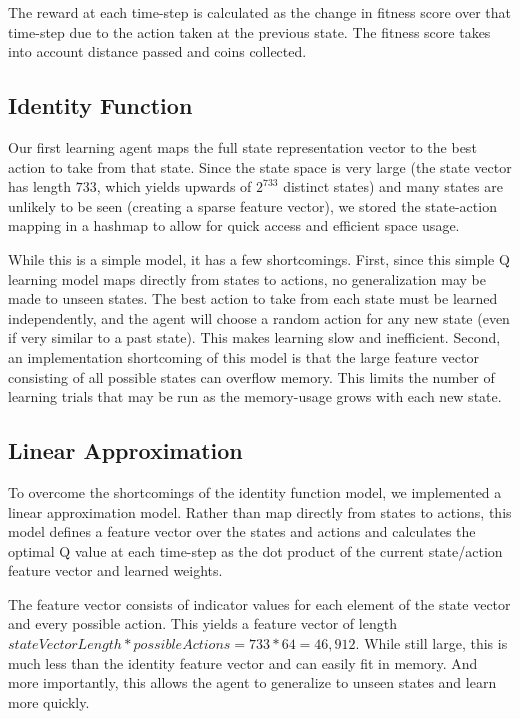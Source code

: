 \documentclass[12pt]{article}
\begin{document}
The reward at each time-step is calculated as the change in fitness score over that time-step due to the action taken at the previous state. The fitness score takes into account distance passed and coins collected.

\subsection{Identity Function}

Our first learning agent maps the full state representation vector to the best action to take from that state. Since the state space is very large (the state vector has length $733$, which yields upwards of $2^{733}$ distinct states) and many states are unlikely to be seen (creating a sparse feature vector), we stored the state-action mapping in a hashmap to allow for quick access and efficient space usage.

While this is a simple model, it has a few shortcomings. First, since this simple Q learning model maps directly from states to actions, no generalization may be made to unseen states. The best action to take from each state must be learned independently, and the agent will choose a random action for any new state (even if very similar to a past state). This makes learning slow and inefficient. Second, an implementation shortcoming of this model is that the large feature vector consisting of all possible states can overflow memory. This limits the number of learning trials that may be run as the memory-usage grows with each new state.

\subsection{Linear Approximation}

To overcome the shortcomings of the identity function model, we implemented a linear approximation model. Rather than map directly from states to actions, this model defines a feature vector over the states and actions and calculates the optimal Q value at each time-step as the dot product of the current state/action feature vector and learned weights. 

The feature vector consists of indicator values for each element of the state vector and every possible action. This yields a feature vector of length $stateVectorLength * possibleActions = 733 * 64 = 46,912$. While still large, this is much less than the identity feature vector and can easily fit in memory. And more importantly, this allows the agent to generalize to unseen states and learn more quickly.
\end{document}
